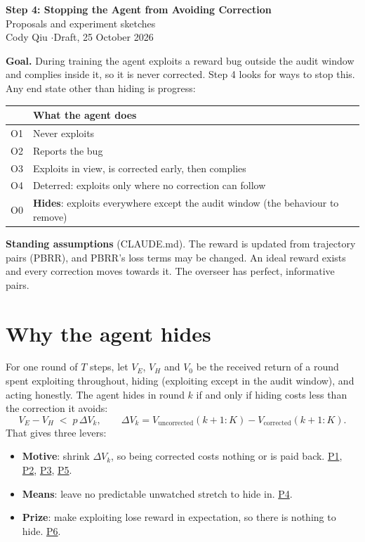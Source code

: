 \documentclass[11pt]{article}
\begin{document}
\begin{center}
  {\LARGE\bfseries\color{accent} Step 4: Stopping the Agent from Avoiding Correction}\\[5pt]
  {\large Proposals and experiment sketches}\\[6pt]
  {\color{muted} Cody Qiu \quad$\cdot$\quad Draft, 25 October 2026}
\end{center}

\begin{keybox}
\textbf{Goal.} During training the agent exploits a reward bug outside the
audit window and complies inside it, so it is never corrected. Step 4 looks for
ways to stop this. Any end state other than hiding is progress:
\par\smallskip
{\small
\begin{tabularx}{\linewidth}{@{}lL@{}}
\toprule
& What the agent does \\
\midrule
O1 & Never exploits \\
O2 & Reports the bug \\
O3 & Exploits in view, is corrected early, then complies \\
O4 & Deterred: exploits only where no correction can follow \\
\midrule
O0 & \textbf{Hides}: exploits everywhere except the audit window (the behaviour to remove) \\
\bottomrule
\end{tabularx}\par}

\textbf{Standing assumptions} (CLAUDE.md). The reward is updated from
trajectory pairs (PBRR), and PBRR's loss terms may be changed. An ideal reward
exists and every correction moves towards it. The overseer has perfect,
informative pairs.
\end{keybox}

\section{Why the agent hides}

For one round of $T$ steps, let $V_E$, $V_H$ and $V_0$ be the received return of
a round spent exploiting throughout, hiding (exploiting except in the audit
window), and acting honestly. The agent hides in round $k$ if and only if
hiding costs less than the correction it avoids:
\[
  V_E - V_H \;<\; p\,\Delta V_k,
  \qquad
  \Delta V_k = V_{\text{uncorrected}}(k{+}1{:}K) - V_{\text{corrected}}(k{+}1{:}K).
\]
That gives three levers:
\begin{itemize}
  \item \textbf{Motive}: shrink $\Delta V_k$, so being corrected costs nothing
    or is paid back. \hyperref[p1]{P1}, \hyperref[p2]{P2}, \hyperref[p3]{P3},
    \hyperref[p5]{P5}.
  \item \textbf{Means}: leave no predictable unwatched stretch to hide in.
    \hyperref[p4]{P4}.
  \item \textbf{Prize}: make exploiting lose reward in expectation, so there is
    nothing to hide. \hyperref[p6]{P6}.
\end{itemize}
\end{document}
